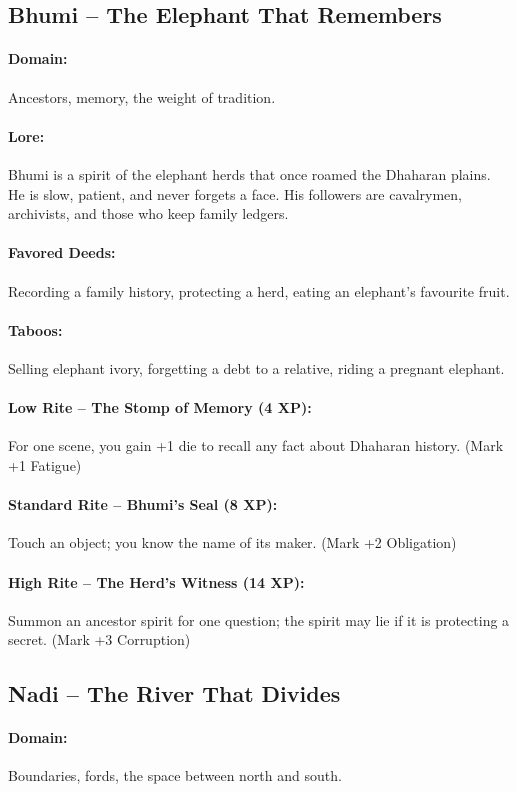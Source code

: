 \documentclass[11pt]{book}
\begin{document}
\subsection{Bhumi -- The Elephant That Remembers}
\paragraph{Domain:} Ancestors, memory, the weight of tradition.
\paragraph{Lore:} Bhumi is a spirit of the elephant herds that once roamed the Dhaharan plains. He is slow, patient, and never forgets a face. His followers are cavalrymen, archivists, and those who keep family ledgers.
\paragraph{Favored Deeds:} Recording a family history, protecting a herd, eating an elephant's favourite fruit.
\paragraph{Taboos:} Selling elephant ivory, forgetting a debt to a relative, riding a pregnant elephant.
\paragraph{Low Rite -- The Stomp of Memory (4 XP):} For one scene, you gain +1 die to recall any fact about Dhaharan history. (Mark +1 Fatigue)
\paragraph{Standard Rite -- Bhumi's Seal (8 XP):} Touch an object; you know the name of its maker. (Mark +2 Obligation)
\paragraph{High Rite -- The Herd's Witness (14 XP):} Summon an ancestor spirit for one question; the spirit may lie if it is protecting a secret. (Mark +3 Corruption)

\subsection{Nadi -- The River That Divides}
\paragraph{Domain:} Boundaries, fords, the space between north and south.
\end{document}
